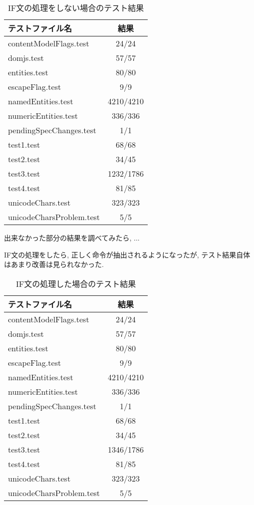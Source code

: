 \documentclass[uplatex,a4j]{jsreport}
\begin{document}
\begin{table}[H]
  \begin{center}
    \label{IFの処理なし}
    \caption{IF文の処理をしない場合のテスト結果}
    \begin{tabular}{|l|c|} \hline
      テストファイル名 & 結果 \\ \hline 
      contentModelFlags.test & 24/24 \\
      domjs.test & 57/57  \\
      entities.test & 80/80 \\
      escapeFlag.test & 9/9 \\
      namedEntities.test & 4210/4210 \\
      numericEntities.test & 336/336 \\
      pendingSpecChanges.test & 1/1 \\
      test1.test & 68/68 \\
      test2.test & 34/45 \\
      test3.test & 1232/1786 \\
      test4.test & 81/85 \\
      unicodeChars.test & 323/323 \\
      unicodeCharsProblem.test & 5/5 \\ \hline 
    \end{tabular}
  \end{center}
\end{table}
出来なかった部分の結果を調べてみたら, ...

IF文の処理をしたら, 正しく命令が抽出されるようになったが, テスト結果自体はあまり改善は見られなかった.
\begin{table}[H]
  \begin{center}
    \label{IFの処理}
    \caption{IF文の処理した場合のテスト結果}
    \begin{tabular}{|l|c|} \hline
      テストファイル名 & 結果 \\ \hline 
      contentModelFlags.test & 24/24  \\
      domjs.test & 57/57  \\
      entities.test & 80/80 \\
      escapeFlag.test & 9/9 \\
      namedEntities.test & 4210/4210 \\
      numericEntities.test & 336/336 \\
      pendingSpecChanges.test & 1/1 \\
      test1.test & 68/68  \\
      test2.test & 34/45  \\
      test3.test & 1346/1786  \\
      test4.test & 81/85 \\
      unicodeChars.test & 323/323 \\
      unicodeCharsProblem.test & 5/5 \\ \hline 
    \end{tabular}
\end{center}
\end{table}
\end{document}
